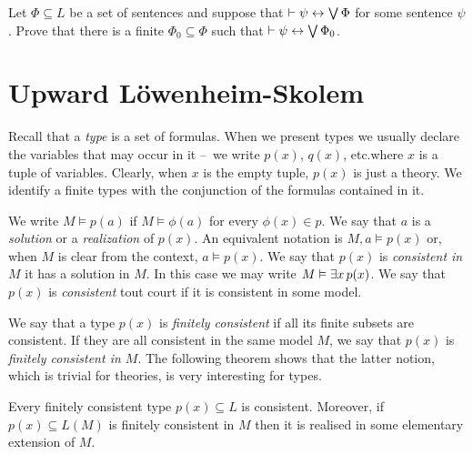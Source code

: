\documentclass[creche.tex]{subfiles}
\begin{document}
\begin{exercise}
Let $\Phi\subseteq L$ be a set of sentences and suppose that $\vdash\psi\leftrightarrow\bigvee\Phi$ for some sentence $\psi$. Prove that there is a finite $\Phi_0\subseteq\Phi$ such that  $\vdash\psi\leftrightarrow\bigvee\Phi_0$.\QED
\end{exercise}


\section{Upward Löwenheim-Skolem}

\def\ceq#1#2#3{\parbox{13ex}{$\displaystyle #1$}\parbox{4ex}{\hfil$#2$}$\displaystyle #3$}
 
Recall that a \emph{type\/} is a set of formulas. When we present types we usually declare the variables that may occur in it --~we write \emph{$p(x)$}, \emph{$q(x)$}, etc.\@ where $x$ is a tuple of variables. Clearly, when $x$ is the empty tuple, $p(x)$ is just a theory. We identify a finite types with the conjunction of the formulas contained in it.

We write \emph{$M\models p(a)$} if $M\models\phi(a)$ for every $\phi(x)\in p$.  We say that $a$ is a \emph{solution\/} or a \emph{realization\/} of $p(x)$. An equivalent notation is \emph{$M,a\models p(x)$} or, when $M$ is clear from the context, \emph{$a\models p(x)$}. We say that $p(x)$ is \emph{consistent in $M$\/} it has a solution in $M$. In this case we may write \emph{$M\vDash\exists x\,p(x)$}.  We say that $p(x)$ is \emph{consistent\/} tout court if it is consistent in some model.

We say that a type $p(x)$ is \emph{finitely consistent\/} if all its finite subsets are consistent. If they are all consistent in the same model $M$, we say that $p(x)$ is \emph{finitely consistent in $M$}. The following theorem shows that the latter notion, which is trivial for theories, is very interesting for types.

\begin{void_thm}\label{thm_compattezzatipi}
Every finitely consistent type $p(x)\subseteq L$ is consistent. Moreover, if $p(x)\subseteq L(M)$ is finitely consistent in $M$ then it is realised in some elementary extension of $M$.
\end{void_thm}
\end{document}
